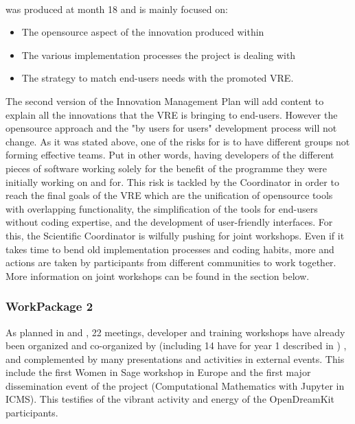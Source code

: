 \documentclass{deliverablereport}
\begin{document}

\paragraph{}

 was produced at month 18 and is mainly focused on: 

\begin{itemize}
\item{The opensource aspect of the innovation produced within \ODK}
\item{The various implementation processes the project is dealing with}
\item{The strategy to match end-users needs with the promoted VRE}.
\end{itemize}

  The second version of the Innovation Management Plan will add content to explain all the
  innovations that the VRE is bringing to end-users. However the opensource approach and
  the "by users for users" development process will not change.  As it was stated above,
  one of the risks for \ODK is to have different groups not forming effective teams. Put
  in other words, having developers of the different pieces of software working solely for
  the benefit of the programme they were initially working on and for. This risk is
  tackled by the Coordinator in order to reach the final goals of the VRE which are the
  unification of opensource tools with overlapping functionality, the simplification of
  the tools for end-users without coding expertise, and the development of user-friendly
  interfaces. For this, the Scientific Coordinator is wilfully pushing for joint
  workshops. Even if it takes time to bend old implementation processes and coding habits,
  more and actions are taken by \ODK participants from different communities to work
  together. More information on joint workshops can be found in the section below.


  \subsubsection{WorkPackage 2}

  As planned in  and
  , 22 meetings, developer and training workshops have already
  been organized and co-organized by \ODK (including 14 have for year 1 described in ) , and complemented by many
  presentations and activities in external events. This include the first Women in Sage workshop in Europe and the
  first major dissemination event of the project (Computational Mathematics with Jupyter in ICMS). This testifies
  of the vibrant activity and energy of the OpenDreamKit participants.
  
\end{document}
